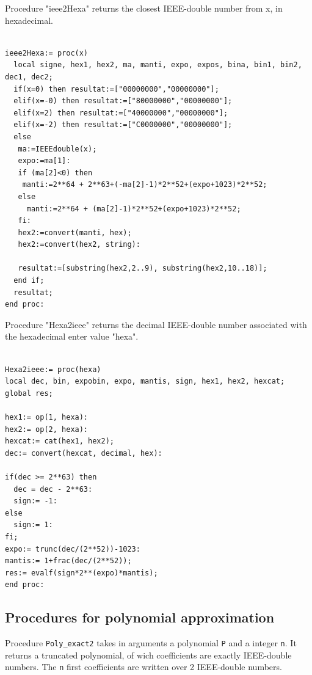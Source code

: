 Procedure "ieee2Hexa" returns the closest IEEE-double number from x, in hexadecimal.

\begin{lstlisting}[caption={ieee2Hexa},firstnumber=1]

ieee2Hexa:= proc(x)
  local signe, hex1, hex2, ma, manti, expo, expos, bina, bin1, bin2, dec1, dec2;
  if(x=0) then resultat:=["00000000","00000000"];
  elif(x=-0) then resultat:=["80000000","00000000"];
  elif(x=2) then resultat:=["40000000","00000000"];
  elif(x=-2) then resultat:=["C0000000","00000000"];
  else
   ma:=IEEEdouble(x);
   expo:=ma[1]:
   if (ma[2]<0) then 
    manti:=2**64 + 2**63+(-ma[2]-1)*2**52+(expo+1023)*2**52;
   else 
     manti:=2**64 + (ma[2]-1)*2**52+(expo+1023)*2**52;
   fi:
   hex2:=convert(manti, hex); 
   hex2:=convert(hex2, string):  
  
   resultat:=[substring(hex2,2..9), substring(hex2,10..18)];
  end if;
  resultat;
end proc:
\end{lstlisting}
\vspace{0.5cm}

Procedure "Hexa2ieee" returns the decimal IEEE-double number associated with the hexadecimal enter value "hexa".

\begin{lstlisting}[caption={Hexa2ieee},firstnumber=1]

Hexa2ieee:= proc(hexa)
local dec, bin, expobin, expo, mantis, sign, hex1, hex2, hexcat;
global res;

hex1:= op(1, hexa):
hex2:= op(2, hexa):
hexcat:= cat(hex1, hex2);
dec:= convert(hexcat, decimal, hex):

if(dec >= 2**63) then
  dec = dec - 2**63:
  sign:= -1:
else
  sign:= 1:
fi;  
expo:= trunc(dec/(2**52))-1023:
mantis:= 1+frac(dec/(2**52));
res:= evalf(sign*2**(expo)*mantis);
end proc:
\end{lstlisting}


\subsection{Procedures for polynomial approximation}


Procedure \texttt{Poly\_exact2} takes in arguments a polynomial \texttt{P} and a
integer \texttt{n}. It returns a truncated polynomial, of wich coefficients
are exactly IEEE-double numbers. The \texttt{n} first coefficients are written
over 2 IEEE-double numbers.
 


